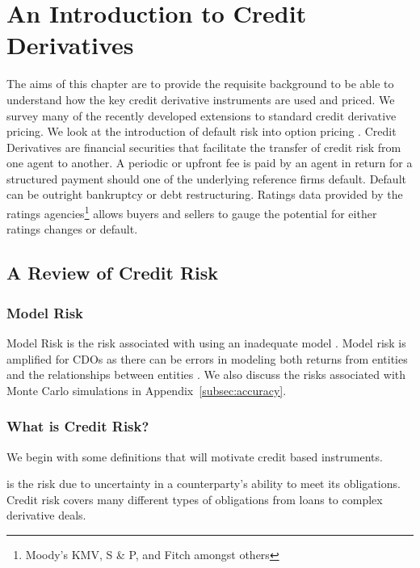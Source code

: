 \chapter{An Introduction to Credit Derivatives}\label{chap:review}

The aims of this chapter are to provide the requisite
background to be able to understand how the key credit derivative instruments are used and priced. We survey many of the recently developed extensions to standard credit derivative pricing. We look at the introduction of default risk into option pricing \cite{JS1987}.
Credit Derivatives are financial securities that facilitate the transfer of credit risk from one agent to another. A periodic or upfront fee is paid by an agent in return for a structured payment should one of the underlying reference firms default.  Default can be outright bankruptcy or debt restructuring. Ratings data provided by the ratings agencies\footnote{Moody's KMV, S \& P, and Fitch amongst others} allows buyers and sellers to gauge the potential for either ratings changes or default.

\section{A Review of Credit Risk}\label{sec:cred_review}

\subsection{Model Risk}

Model Risk is the risk associated with using an inadequate model \cite{hs2002}. Model risk is amplified for CDOs as there can be errors in modeling both returns from entities and the relationships between entities \cite{bv2005}.  We also discuss the risks associated with Monte Carlo simulations in Appendix~\ref{subsec:accuracy}.

\subsection{What is Credit Risk?}

We begin with some definitions that will motivate credit based instruments.

\begin{definition}
\begin{rm}
is the risk due to uncertainty in a counterparty's ability to meet its obligations. Credit risk covers many different types of obligations from loans to complex derivative deals. 
\end{rm}
\end{definition}

